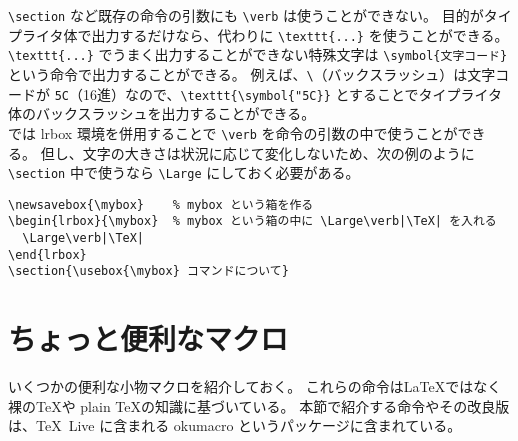 \verb`\section` など既存の命令の引数にも \verb`\verb` は使うことができない。
目的がタイプライタ体で出力するだけなら、代わりに \verb`\texttt{...}` を使うことができる。\\

\verb`\texttt{...}` でうまく出力することができない特殊文字は \verb`\symbol{文字コード}` という命令で出力することができる。
例えば、\verb`\`（バックスラッシュ）は文字コードが \texttt{5C}（16進）なので、\verb`\texttt{\symbol{"5C}}` とすることでタイプライタ体のバックスラッシュを出力することができる。\\

\LaTeXe{}では lrbox 環境を併用することで \verb`\verb` を命令の引数の中で使うことができる。
但し、文字の大きさは状況に応じて変化しないため、次の例のように \verb`\section` 中で使うなら \verb`\Large` にしておく必要がある。
\begin{mdframed}[roundcorner=0.50zw,leftmargin=3.00zw,rightmargin=3.00zw,skipabove=0.40zw,skipbelow=0.40zw,innertopmargin=4.00pt,innerbottommargin=4.00pt,innerleftmargin=5.00pt,innerrightmargin=5.00pt,linecolor=gray!020,linewidth=0.50pt,backgroundcolor=gray!20]
\begin{verbatim}
\newsavebox{\mybox}    % mybox という箱を作る
\begin{lrbox}{\mybox}  % mybox という箱の中に \Large\verb|\TeX| を入れる
  \Large\verb|\TeX|
\end{lrbox}
\section{\usebox{\mybox} コマンドについて}
\end{verbatim}
\end{mdframed}
\section{ちょっと便利なマクロ}
いくつかの便利な小物マクロを紹介しておく。
これらの命令は\LaTeX{}ではなく裸の\TeX{}や plain \TeX{}の知識に基づいている。
本節で紹介する命令やその改良版は、\TeX\ Live に含まれる okumacro というパッケージに含まれている。
